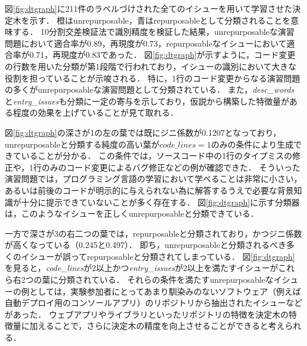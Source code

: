 図\ref{fig:dtgraph}に211件のラベルづけされた全てのイシューを用いて学習させた決定木を示す．
橙はunrepurposable，青はrepurposableとして分類されることを意味する．
10分割交差検証法で識別精度を検証した結果，unrepurposableな演習問題において適合率が0.89，再現度が0.73，repurposableなイシューにおいて適合率が0.71，再現度が0.83であった．
図\ref{fig:dtgraph}が示すように，コード変更の行数を用いた分類が第1段階で行われており，イシューの識別において大きな役割を担っていることが示唆される．
特に，1行のコード変更からなる演習問題の多くがunrepurposableな演習問題として分類されている．
また，\textit{desc\_words}と\textit{entry\_issues}も分類に一定の寄与を示しており，仮説から構築した特徴量がある程度の効果を上げていることが見て取れる．




図\ref{fig:dtgraph}の深さが1の左の葉では既にジニ係数が0.1207となっており，unrepurposableと分類する純度の高い葉が$\textit{code\_lines}=1$のみの条件により生成できていることが分かる．
この条件では，ソースコード中の1行のタイプミスの修正や，1行のみのコード変更によるバグ修正などの例が確認できた．
そういった演習問題では，プログラミング言語の学習において学べることは非常に小さい，あるいは前後のコードが明示的に与えられない為に解答するうえで必要な背景知識が十分に提示できていないことが多く存在する．
図\ref{fig:dtgraph}に示す分類器は，このようなイシューを正しくunrepurposableと分類できている．

一方で深さが3の右二つの葉では，repurposableと分類されており，かつジニ係数が高くなっている（0.245と0.497）．
即ち，unrepurposableと分類されるべき多くのイシューが誤ってrepurposableと分類されてしまっている．
図\ref{fig:dtgraph}を見ると，\textit{code\_lines}が2以上かつ\textit{entry\_issues}が2以上を満たすイシューがこれら右2つの葉に分類されている．
それらの条件を満たすunrepurposableなイシューの例としては，実験参加者にとってあまり馴染みのないソフトウェア（例えば自動デプロイ用のコンソールアプリ）のリポジトリから抽出されたイシューなどがあった．
ウェブアプリやライブラリといったリポジトリの特徴を決定木の特徴量に加えることで，さらに決定木の精度を向上させることができると考えられる．

